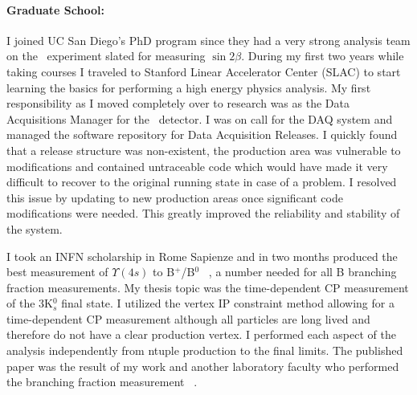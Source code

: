 \documentclass[11pt]{article}
\begin{document}

\paragraph{Graduate School:}I joined UC San Diego's PhD program since they had a very strong analysis team on the \babar\ experiment slated for measuring $\sin 2 \beta $.  During my first two years while taking courses I traveled to Stanford Linear Accelerator Center (SLAC) to start
learning the basics for performing a high energy physics analysis. My first responsibility as I moved completely over to research was as the Data Acquisitions Manager for the \babar\ detector.  I was on call
for the DAQ system and managed the software repository for Data Acquisition Releases.  I quickly found that a release structure was non-existent, the production area was vulnerable to modifications
and contained untraceable code which would have made it very difficult to recover to the original running state in case of a problem.  I resolved this issue by updating to new production areas once significant code modifications were needed. This greatly improved the reliability and stability of the system.


I took an INFN scholarship in Rome Sapienze and in two months produced the best measurement of $\Upsilon(4s)$ to B$^+$/B$^0$ ~\cite{bab0}, a number needed for all B branching fraction measurements. 
My thesis topic was the time-dependent CP measurement of the 3K$^0_s$ final state.
I utilized the vertex IP constraint method allowing for a time-dependent CP measurement although all particles are long lived and therefore do not have a clear production vertex.  
I performed each aspect of the analysis independently from ntuple production to the final limits.  The published paper was the result of my work and another laboratory faculty who performed the branching fraction measurement ~\cite{bab1}.
\end{document}
